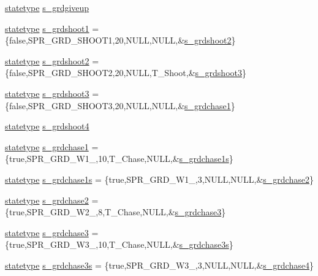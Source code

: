 \begin{DoxyCompactItemize}
\hyperlink{structstatestruct}{statetype} \hyperlink{WL__ACT2_8C_a2de60c43c99fad09ca06d66604c5dc9d}{s\_\-grdgiveup}
\item 
\hyperlink{structstatestruct}{statetype} \hyperlink{WL__ACT2_8C_a39b5370f31810ba2344e1444df90c005}{s\_\-grdshoot1} = \{false,SPR\_\-GRD\_\-SHOOT1,20,NULL,NULL,\&\hyperlink{WL__ACT2_8C_aeb91a0672afeb327c1fcf4b2b8eba34f}{s\_\-grdshoot2}\}
\item 
\hyperlink{structstatestruct}{statetype} \hyperlink{WL__ACT2_8C_aeb91a0672afeb327c1fcf4b2b8eba34f}{s\_\-grdshoot2} = \{false,SPR\_\-GRD\_\-SHOOT2,20,NULL,T\_\-Shoot,\&\hyperlink{WL__ACT2_8C_ac3860c54706008267e1a959fe5c9bec2}{s\_\-grdshoot3}\}
\item 
\hyperlink{structstatestruct}{statetype} \hyperlink{WL__ACT2_8C_ac3860c54706008267e1a959fe5c9bec2}{s\_\-grdshoot3} = \{false,SPR\_\-GRD\_\-SHOOT3,20,NULL,NULL,\&\hyperlink{WL__DEF_8H_a1d9f3438111fc0b2e57f2c72d5e8aa42}{s\_\-grdchase1}\}
\item 
\hyperlink{structstatestruct}{statetype} \hyperlink{WL__ACT2_8C_ad4618db66286b9a721f5928dd2f9d3f2}{s\_\-grdshoot4}
\item 
\hyperlink{structstatestruct}{statetype} \hyperlink{WL__ACT2_8C_a1d9f3438111fc0b2e57f2c72d5e8aa42}{s\_\-grdchase1} = \{true,SPR\_\-GRD\_\-W1\_,10,T\_\-Chase,NULL,\&\hyperlink{WL__ACT2_8C_a2e312b10f1b805aab5351e70fb446b75}{s\_\-grdchase1s}\}
\item 
\hyperlink{structstatestruct}{statetype} \hyperlink{WL__ACT2_8C_a2e312b10f1b805aab5351e70fb446b75}{s\_\-grdchase1s} = \{true,SPR\_\-GRD\_\-W1\_,3,NULL,NULL,\&\hyperlink{WL__ACT2_8C_a55ddfc7f10c016af1aa2478e9bb8dad8}{s\_\-grdchase2}\}
\item 
\hyperlink{structstatestruct}{statetype} \hyperlink{WL__ACT2_8C_a55ddfc7f10c016af1aa2478e9bb8dad8}{s\_\-grdchase2} = \{true,SPR\_\-GRD\_\-W2\_,8,T\_\-Chase,NULL,\&\hyperlink{WL__ACT2_8C_a8bc87beffeb977a5c95f49302ac14a72}{s\_\-grdchase3}\}
\item 
\hyperlink{structstatestruct}{statetype} \hyperlink{WL__ACT2_8C_a8bc87beffeb977a5c95f49302ac14a72}{s\_\-grdchase3} = \{true,SPR\_\-GRD\_\-W3\_,10,T\_\-Chase,NULL,\&\hyperlink{WL__ACT2_8C_add94e5dfbb86ff5e37cc5e00d5a09afe}{s\_\-grdchase3s}\}
\item 
\hyperlink{structstatestruct}{statetype} \hyperlink{WL__ACT2_8C_add94e5dfbb86ff5e37cc5e00d5a09afe}{s\_\-grdchase3s} = \{true,SPR\_\-GRD\_\-W3\_,3,NULL,NULL,\&\hyperlink{WL__ACT2_8C_a300ee63f6cbbc3b04ad6a46f8f553e5f}{s\_\-grdchase4}\}
\item 

\end{DoxyCompactItemize}
